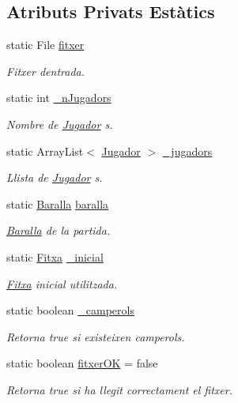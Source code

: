 \subsection*{Atributs Privats Estàtics}
\begin{DoxyCompactItemize}
\item 
static File \mbox{\hyperlink{class_llegir_fitxer_a81ceab1221bd739556c180354469e191}{fitxer}}
\begin{DoxyCompactList}\small\item\em Fitxer d\textquotesingle{}entrada. \end{DoxyCompactList}\item 
static int \mbox{\hyperlink{class_llegir_fitxer_a1095570f847e8cd810965ef23cb9d8c7}{\+\_\+n\+Jugadors}}
\begin{DoxyCompactList}\small\item\em Nombre de \mbox{\hyperlink{class_jugador}{Jugador}} s. \end{DoxyCompactList}\item 
static Array\+List$<$ \mbox{\hyperlink{class_jugador}{Jugador}} $>$ \mbox{\hyperlink{class_llegir_fitxer_a8009ba77511b60a636adb738cddef7b4}{\+\_\+jugadors}}
\begin{DoxyCompactList}\small\item\em Llista de \mbox{\hyperlink{class_jugador}{Jugador}} s. \end{DoxyCompactList}\item 
static \mbox{\hyperlink{class_baralla}{Baralla}} \mbox{\hyperlink{class_llegir_fitxer_a4b0573e74fe3c97662eb06322cdd4bae}{baralla}}
\begin{DoxyCompactList}\small\item\em \mbox{\hyperlink{class_baralla}{Baralla}} de la partida. \end{DoxyCompactList}\item 
static \mbox{\hyperlink{class_fitxa}{Fitxa}} \mbox{\hyperlink{class_llegir_fitxer_a6e734852134240534b6fd54eb263eaf5}{\+\_\+inicial}}
\begin{DoxyCompactList}\small\item\em \mbox{\hyperlink{class_fitxa}{Fitxa}} inicial utilitzada. \end{DoxyCompactList}\item 
static boolean \mbox{\hyperlink{class_llegir_fitxer_a1f155a3c0d9f6df5866f37e2f6e0dd9f}{\+\_\+camperols}}
\begin{DoxyCompactList}\small\item\em Retorna true si existeixen camperols. \end{DoxyCompactList}\item 
static boolean \mbox{\hyperlink{class_llegir_fitxer_a5f1f80e4456840164411de8a5756c716}{fitxer\+OK}} = false
\begin{DoxyCompactList}\small\item\em Retorna true si ha llegit correctament el fitxer. \end{DoxyCompactList}\end{DoxyCompactItemize}


